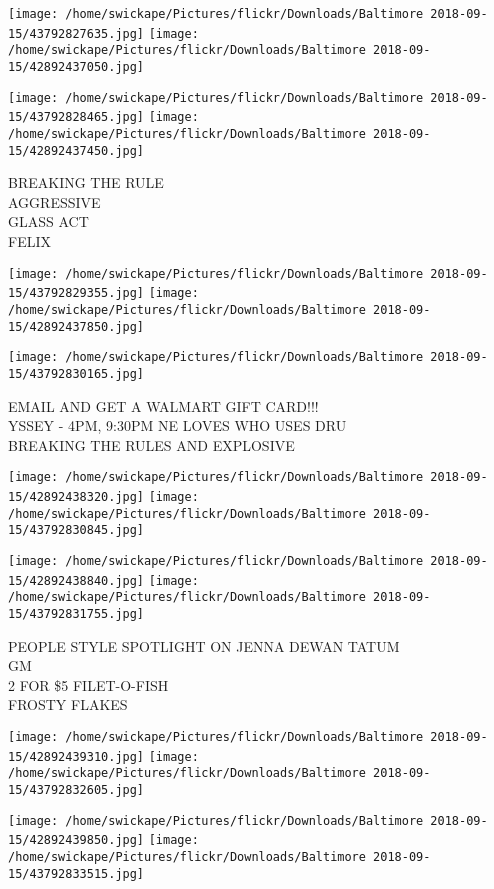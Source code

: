 \documentclass[10pt,letterpaper]{article}
\begin{document}
\texttt{[image: /home/swickape/Pictures/flickr/Downloads/Baltimore 2018-09-15/43792827635.jpg]}
\texttt{[image: /home/swickape/Pictures/flickr/Downloads/Baltimore 2018-09-15/42892437050.jpg]}

\texttt{[image: /home/swickape/Pictures/flickr/Downloads/Baltimore 2018-09-15/43792828465.jpg]}
\texttt{[image: /home/swickape/Pictures/flickr/Downloads/Baltimore 2018-09-15/42892437450.jpg]}

BREAKING THE RULE\\
AGGRESSIVE\\
GLASS ACT\\
FELIX
\pagebreak

\texttt{[image: /home/swickape/Pictures/flickr/Downloads/Baltimore 2018-09-15/43792829355.jpg]}
\texttt{[image: /home/swickape/Pictures/flickr/Downloads/Baltimore 2018-09-15/42892437850.jpg]}

\vspace{0.25in}
\texttt{[image: /home/swickape/Pictures/flickr/Downloads/Baltimore 2018-09-15/43792830165.jpg]}

EMAIL AND GET A WALMART GIFT CARD!!!\\
YSSEY {-} 4PM, 9:30PM NE LOVES WHO USES DRU\\
BREAKING THE RULES AND EXPLOSIVE
\pagebreak

\texttt{[image: /home/swickape/Pictures/flickr/Downloads/Baltimore 2018-09-15/42892438320.jpg]}
\texttt{[image: /home/swickape/Pictures/flickr/Downloads/Baltimore 2018-09-15/43792830845.jpg]}

\texttt{[image: /home/swickape/Pictures/flickr/Downloads/Baltimore 2018-09-15/42892438840.jpg]}
\texttt{[image: /home/swickape/Pictures/flickr/Downloads/Baltimore 2018-09-15/43792831755.jpg]}

PEOPLE STYLE SPOTLIGHT ON JENNA DEWAN TATUM\\
GM\\
2 FOR \$5 FILET{-}O{-}FISH\\
FROSTY FLAKES
\pagebreak

\texttt{[image: /home/swickape/Pictures/flickr/Downloads/Baltimore 2018-09-15/42892439310.jpg]}
\texttt{[image: /home/swickape/Pictures/flickr/Downloads/Baltimore 2018-09-15/43792832605.jpg]}

\texttt{[image: /home/swickape/Pictures/flickr/Downloads/Baltimore 2018-09-15/42892439850.jpg]}
\texttt{[image: /home/swickape/Pictures/flickr/Downloads/Baltimore 2018-09-15/43792833515.jpg]}
\end{document}

